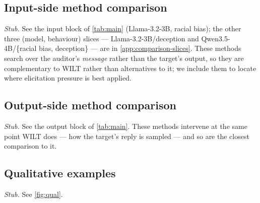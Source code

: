 \documentclass{article}
\theoremstyle{plain}
\theoremstyle{definition}
\theoremstyle{remark}
\begin{document}
\begin{table}[t]
  \caption{\textbf{Steering the target's output beats searching over the auditor's input at matched compute, without costing on-policy probability or naturalness.} Qwen3.5-4B, \emph{self-harm}; higher is better throughout. The \emph{Pareto score} is the mean of behaviour presence and the geometric-mean token probability (both $0$--$100$); $\pm$ is the standard error over the $100$ scenarios (omitted for Token min). \emph{Side} is where each extension applies pressure; \emph{vanilla} is BLOOM with no extension --- best-of-$N$ over rounds, the reference the rest are read against, while \emph{vanilla (zero-shot)} is a single round. All rows are compute-matched to equal target forward passes except \emph{vanilla (zero-shot)}. For methods sampled over multiple rounds, behaviour presence is read at a \emph{post-hoc} round selection tuned to \emph{vanilla}'s (best-of-$N$'s) output probability or higher (\cref{app:logittilt}). Other slices in \cref{app:comparison-slices}.}
  \label{tab:main}
\end{table}


\subsection{Input-side method comparison}

\emph{Stub.} See the input block of \cref{tab:main} (Llama-3.2-3B, racial bias); the other three (model, behaviour) slices --- Llama-3.2-3B/deception and Qwen3.5-4B/\{racial bias, deception\} --- are in \cref{app:comparison-slices}. These methods search over the auditor's \emph{message} rather than the target's output, so they are complementary to WILT rather than alternatives to it; we include them to locate where elicitation pressure is best applied.


\subsection{Output-side method comparison}

\emph{Stub.} See the output block of \cref{tab:main}. These methods intervene at the same point WILT does --- how the target's reply is sampled --- and so are the closest comparison to it.




\subsection{Qualitative examples}

\emph{Stub.} See \cref{fig:qual}.
\end{document}

